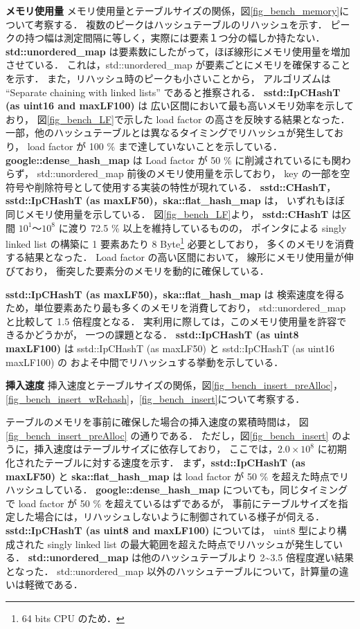 %
{\bf メモリ使用量}
\samepage\newline\indent
メモリ使用量とテーブルサイズの関係，図\ref{fig_bench_memory}について考察する．
複数のピークはハッシュテーブルのリハッシュを示す．
ピークの持つ幅は測定間隔に等しく，実際には要素１つ分の幅しか持たない．
{\bf std::unordered\_map} は要素数にしたがって，ほぼ線形にメモリ使用量を増加させている．
これは，std::unordered\_map が要素ごとにメモリを確保することを示す．
また，リハッシュ時のピークも小さいことから，
アルゴリズムは ``Separate chaining with linked lists'' であると推察される．
{\bf sstd::IpCHashT (as uint16 and maxLF100)} は
広い区間において最も高いメモリ効率を示しており，
図\ref{fig_bench_LF}で示した load factor の高さを反映する結果となった．
一部，他のハッシュテーブルとは異なるタイミングでリハッシュが発生しており，
load factor が 100 \% まで達していないことを示している．
{\bf google::dense\_hash\_map} は
Load factor が 50 \% に削減されているにも関わらず，
std::unordered\_map 前後のメモリ使用量を示しており，
key の一部を空符号や削除符号として使用する実装の特性が現れている．
{\bf sstd::CHashT}，{\bf sstd::IpCHashT (as maxLF50)}，{\bf ska::flat\_hash\_map} は，
いずれもほぼ同じメモリ使用量を示している．
図\ref{fig_bench_LF}より，
{\bf sstd::CHashT} は区間 $10^1〜10^8$ に渡り 72.5 \% 以上を維持しているものの，
ポインタによる singly linked list の構築に 1 要素あたり 8 Byte\footnote{64 bits CPU のため．} 必要としており，
多くのメモリを消費する結果となった．
Load factor の高い区間において，
線形にメモリ使用量が伸びており，
衝突した要素分のメモリを動的に確保している．


\noindent
{\bf sstd::IpCHashT (as maxLF50)}，{\bf ska::flat\_hash\_map} は
検索速度を得るため，単位要素あたり最も多くのメモリを消費しており，
std::unordered\_map と比較して 1.5 倍程度となる．
実利用に際しては，このメモリ使用量を許容できるかどうかが，
一つの課題となる．
{\bf sstd::IpCHashT (as uint8 maxLF100)} は
sstd::IpCHashT (as maxLF50) と sstd::IpCHashT (as uint16 maxLF100) の
およそ中間でリハッシュする挙動を示している．
\leavevmode \newline

%
{\bf 挿入速度}
\samepage\newline\indent
挿入速度とテーブルサイズの関係，図\ref{fig_bench_insert_preAlloc}，\ref{fig_bench_insert_wRehash}，\ref{fig_bench_insert}について考察する．

テーブルのメモリを事前に確保した場合の挿入速度の累積時間は，
図\ref{fig_bench_insert_preAlloc} の通りである．
ただし，図\ref{fig_bench_insert} のように，挿入速度はテーブルサイズに依存しており，
ここでは，$2.0\times10^8$ に初期化されたテーブルに対する速度を示す．
まず，{\bf sstd::IpCHashT (as maxLF50)} と {\bf ska::flat\_hash\_map} は load factor が 50 \% を超えた時点でリハッシュしている．
{\bf google::dense\_hash\_map} についても，同じタイミングで load factor が 50 \% を超えているはずであるが，
事前にテーブルサイズを指定した場合には，リハッシュしないように制御されている様子が伺える．
{\bf sstd::IpCHashT (as uint8 and maxLF100)} については，
uint8 型により構成された singly linked list の最大範囲を超えた時点でリハッシュが発生している．
{\bf std::unordered\_map} は他のハッシュテーブルより 2\textasciitilde 3.5 倍程度遅い結果となった．
std::unordered\_map 以外のハッシュテーブルについて，計算量の違いは軽微である．

